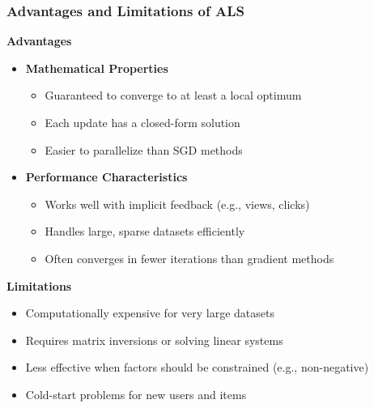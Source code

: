 \documentclass{beamer}
\begin{document}
\begin{frame}
\frametitle{Advantages and Limitations of ALS}

\textbf{Advantages}
\begin{itemize}
    \item \textbf{Mathematical Properties}
    \begin{itemize}
        \item Guaranteed to converge to at least a local optimum
        \item Each update has a closed-form solution
        \item Easier to parallelize than SGD methods
    \end{itemize}
    
    \item \textbf{Performance Characteristics}
    \begin{itemize}
        \item Works well with implicit feedback (e.g., views, clicks)
        \item Handles large, sparse datasets efficiently
        \item Often converges in fewer iterations than gradient methods
    \end{itemize}
\end{itemize}

\textbf{Limitations}
\begin{itemize}
    \item Computationally expensive for very large datasets
    \item Requires matrix inversions or solving linear systems
    \item Less effective when factors should be constrained (e.g., non-negative)
    \item Cold-start problems for new users and items
\end{itemize}
\end{frame}
\end{document}
